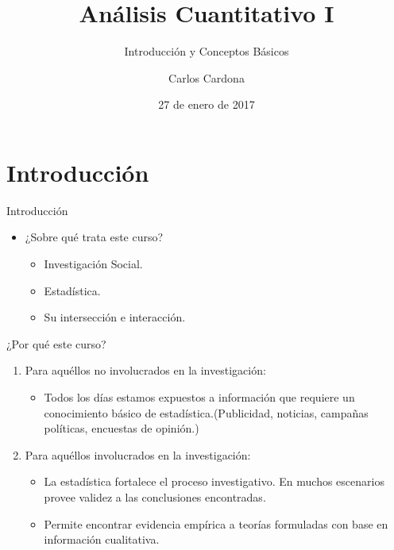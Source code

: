 \documentclass[xcolor=dvipsnames]{beamer}
\author[Carlos Cardona]{Carlos Cardona}
\title{Análisis Cuantitativo I}
\subtitle{Introducción y Conceptos Básicos}
\institute[URosario]{Universidad del Rosario}
\date{27 de enero de 2017}
\begin{document}
\maketitle
	
\section{Introducción}
\begin{frame}{Introducción}
	
\begin{itemize}
\justifying
\item ¿Sobre qué trata este curso?
\begin{itemize}
\item Investigación Social.
\item Estadística.
\item Su intersección e interacción.
\end{itemize}
\end{itemize}
\end{frame}

\begin{frame}{¿Por qué este curso?}

	\begin{enumerate}
		\justifying
\item Para aquéllos no involucrados en la investigación:
\begin{itemize}
	\justifying
\item Todos los días estamos expuestos a información que requiere un conocimiento básico de estadística.(Publicidad, noticias, campañas políticas, encuestas de opinión.) 
\end{itemize}
\item Para aquéllos involucrados en la investigación:
\begin{itemize}
		\justifying
\item La estadística fortalece el proceso investigativo. En muchos escenarios provee validez a las conclusiones encontradas.
\item Permite encontrar evidencia empírica a teorías formuladas con base en información cualitativa. 
\end{itemize}
\end{enumerate}
\end{frame}
\end{document}
